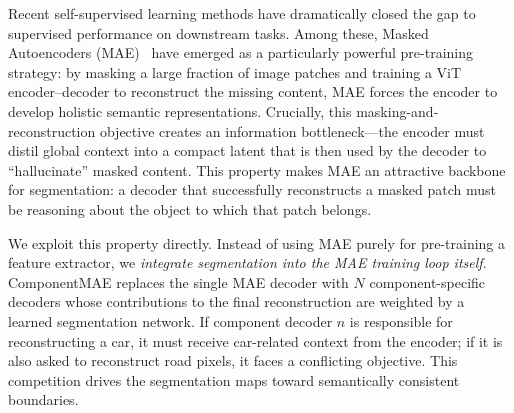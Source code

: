 \documentclass{article}
\begin{document}
Recent self-supervised learning methods have dramatically closed the gap to
supervised performance on downstream tasks.  Among these, Masked Autoencoders
(MAE)~\cite{he2022masked} have emerged as a particularly powerful pre-training
strategy: by masking a large fraction of image patches and training a ViT encoder--decoder
to reconstruct the missing content, MAE forces the encoder to develop holistic
semantic representations.  Crucially, this masking-and-reconstruction objective
creates an information bottleneck---the encoder must distil global context into a
compact latent that is then used by the decoder to ``hallucinate'' masked content.
This property makes MAE an attractive backbone for segmentation: a decoder that
successfully reconstructs a masked patch must be reasoning about the object to
which that patch belongs.

We exploit this property directly.  Instead of using MAE purely for pre-training
a feature extractor, we \emph{integrate segmentation into the MAE training loop
itself}.  ComponentMAE replaces the single MAE decoder with $N$ component-specific
decoders whose contributions to the final reconstruction are weighted by a learned
segmentation network.  If component decoder $n$ is responsible for reconstructing
a car, it must receive car-related context from the encoder; if it is also asked to
reconstruct road pixels, it faces a conflicting objective.  This competition drives
the segmentation maps toward semantically consistent boundaries.
\end{document}

